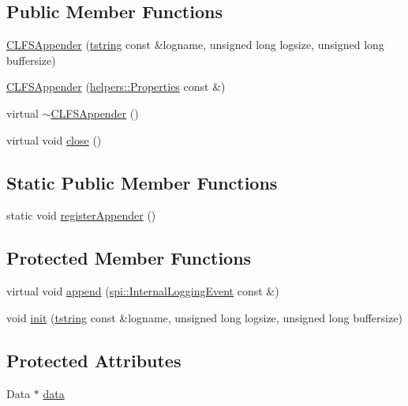 \subsection*{Public Member Functions}
\begin{DoxyCompactItemize}
\item 
\hyperlink{classlog4cplus_1_1CLFSAppender_a218c1129a9e8cb2d948691b83fcbb75f}{C\-L\-F\-S\-Appender} (\hyperlink{namespacelog4cplus_a3c9287f6ebcddc50355e29d71152117b}{tstring} const \&logname, unsigned long logsize, unsigned long buffersize)
\item 
\hyperlink{classlog4cplus_1_1CLFSAppender_afbbc8094021697dbeea125d949a1753b}{C\-L\-F\-S\-Appender} (\hyperlink{classlog4cplus_1_1helpers_1_1Properties}{helpers\-::\-Properties} const \&)
\item 
virtual \hyperlink{classlog4cplus_1_1CLFSAppender_a3748254e7c50eb713db56cd916af68b2}{$\sim$\-C\-L\-F\-S\-Appender} ()
\item 
virtual void \hyperlink{classlog4cplus_1_1CLFSAppender_aa083cc4d373963d08cc0751f8ead4892}{close} ()
\end{DoxyCompactItemize}
\subsection*{Static Public Member Functions}
\begin{DoxyCompactItemize}
\item 
static void \hyperlink{classlog4cplus_1_1CLFSAppender_a0cfb1f482cc731821ed47a4210baa215}{register\-Appender} ()
\end{DoxyCompactItemize}
\subsection*{Protected Member Functions}
\begin{DoxyCompactItemize}
\item 
virtual void \hyperlink{classlog4cplus_1_1CLFSAppender_a98b2bd6d22add8023e362c3cfeb9826b}{append} (\hyperlink{classlog4cplus_1_1spi_1_1InternalLoggingEvent}{spi\-::\-Internal\-Logging\-Event} const \&)
\item 
void \hyperlink{classlog4cplus_1_1CLFSAppender_aa702ca606d9e69474f7b07941c5926b0}{init} (\hyperlink{namespacelog4cplus_a3c9287f6ebcddc50355e29d71152117b}{tstring} const \&logname, unsigned long logsize, unsigned long buffersize)
\end{DoxyCompactItemize}
\subsection*{Protected Attributes}
\begin{DoxyCompactItemize}
\item 
Data $\ast$ \hyperlink{classlog4cplus_1_1CLFSAppender_ae842ff5e5e2defd9d49eb5ff165b0913}{data}
\end{DoxyCompactItemize}
